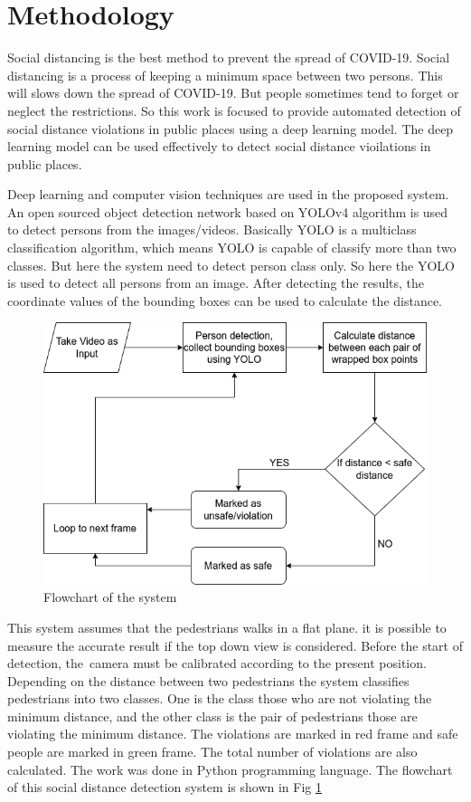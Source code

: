 \documentclass{svproc}
\begin{document}
\section{Methodology}
Social distancing is the best method to prevent the spread of COVID-19. Social distancing is a process of keeping a minimum space between two persons. This will slows down the spread of COVID-19. But people sometimes tend to forget or neglect the restrictions. So this work is focused to provide automated detection of social distance violations in public places using a deep learning model. The deep learning model can be used effectively to detect social distance vioilations in public places.
\par 
Deep learning and computer vision techniques are used in the proposed system. An open sourced object detection network based on YOLOv4 \cite{yolov4} algorithm is used to detect persons from the images/videos. Basically YOLO is a multiclass classification algorithm, which means YOLO is capable of classify more than two classes. But here the system need to detect person class only. So here the YOLO is used to detect all persons \cite{10} from an image. After detecting the results, the coordinate values of the bounding boxes can be used to calculate the distance. 
\par
\begin{figure}[!h]
	\includegraphics[width=\columnwidth]{./images/flowchart.png}
	\caption{Flowchart of the system}
	\label{pipeline}
\end{figure} 
This system assumes that the pedestrians walks in a flat plane. it is possible to measure the accurate result if the top down view is considered. Before the start of detection, the camera must be calibrated according to the present position. Depending on the distance between two pedestrians the system classifies pedestrians into two classes. One is the class those who are not violating the minimum distance, and the other class is the pair of pedestrians those are violating the minimum distance. The violations are marked in red frame and safe people are marked in green frame. The total number of violations are also calculated. The work was done in Python programming language. The flowchart of this social distance detection system is shown in Fig \ref{pipeline}
\end{document}

